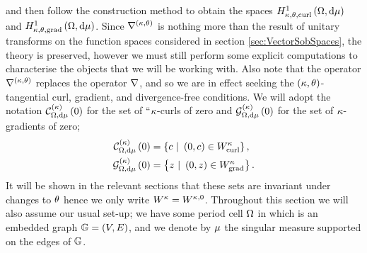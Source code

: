 and then follow the construction method to obtain the spaces $H^1_{\kappa,\theta,\mathrm{curl}}\left( \Omega, \mathrm{d}\mu \right)$ and $H^1_{\kappa,\theta,\mathrm{grad}}\left( \Omega, \mathrm{d}\mu \right)$.
Since $\nabla^{\left( \kappa, \theta \right)}$ is nothing more than the result of unitary transforms on the function spaces considered in section \ref{sec:VectorSobSpaces}, the theory is preserved, however we must still perform some explicit computations to characterise the objects that we will be working with.
Also note that the operator $\nabla^{\left( \kappa, \theta \right)}$ replaces the operator $\nabla$, and so we are in effect seeking the $\left( \kappa,\theta \right)$-tangential curl, gradient, and divergence-free conditions. 
We will adopt the notation $\mathcal{C}_{ \Omega, \mathrm{d}\mu}^{(\kappa)}\left( 0 \right)$ for the set of ``$\kappa$-curls of zero and $\mathcal{G}_{ \Omega, \mathrm{d}\mu}^{(\kappa)}\left( 0 \right)$ for the set of $\kappa$-gradients of zero;
\begin{align*}
	\kcurlZero{\ddom}{\ddmes} &= \clbracs{ c \ \vert \ \bracs{0,c}\in W^{\wavenumber}_{\mathrm{curl}}}, \\
	\kgradZero{\ddom}{\ddmes} &= \clbracs{ z \ \vert \ \bracs{0,z}\in W^{\wavenumber}_{\mathrm{grad}}}.
\end{align*}
It will be shown in the relevant sections that these sets are invariant under changes to $\theta$ hence we only write $W^{\kappa} = W^{\kappa, 0}$.
Throughout this section we will also assume our usual set-up; we have some period cell $\Omega$ in which is an embedded graph $\mathbb{G}=\left( V,E \right)$, and we denote by $\mu$ the singular measure supported on the edges of $\mathbb{G}$.

